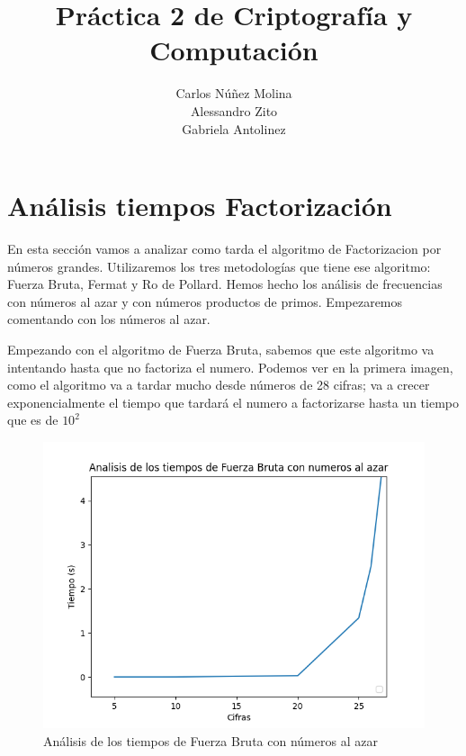 \documentclass{article}
\title{Práctica 2 de Criptografía y Computación}
\date{}
\author{Carlos Núñez Molina \\ Alessandro Zito \\ Gabriela Antolinez}
\begin{document}
	\maketitle
	\newpage	
	
    \section{Análisis tiempos Factorización}
    
    En esta sección vamos a analizar como tarda el algoritmo de Factorizacion por números grandes. Utilizaremos los tres metodologías que tiene ese algoritmo: Fuerza Bruta, Fermat y Ro de Pollard. Hemos hecho los análisis de frecuencias con números al azar y con números productos de primos. Empezaremos comentando con los números al azar.
    
    
    Empezando con el algoritmo de Fuerza Bruta, sabemos que este algoritmo va intentando hasta que no factoriza el numero. Podemos ver en la primera imagen, como el algoritmo va a tardar mucho desde números de 28 cifras; va a crecer exponencialmente el tiempo que tardará el numero a factorizarse hasta un tiempo que es de \begin{math}                                                                                    10^{2}
                                                    \end{math}
    
    
    
    \begin{figure}[ht!]
        \centering
        \includegraphics[scale=0.3]{Figure_1}
        \caption{Análisis de los tiempos de Fuerza Bruta con números al azar}
        \label{fig:Figure_1}
    \end{figure}
    
\end{document}
